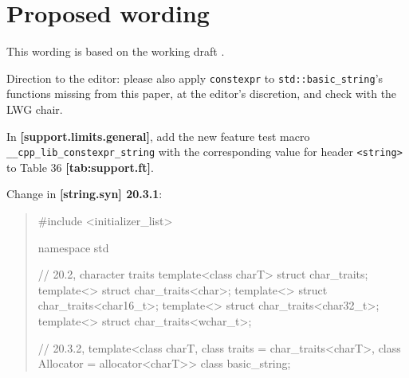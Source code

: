 \documentclass{wg21}
\newcommand{\cc}[1]{\texttt{#1}}
\begin{document}
\section{Proposed wording}
This wording is based on the working draft \cite{N4727}.

Direction to the editor: please also apply \cc{constexpr} to \cc{std::basic_string}'s
functions missing from this paper, at the editor's discretion, and check with
the LWG chair.

In \textbf{[support.limits.general]}, add the new feature test macro
\cc{__cpp_lib_constexpr_string} with the corresponding value for header
\cc{<string>} to Table 36 \textbf{[tab:support.ft]}.

Change in \textbf{[string.syn] 20.3.1}:
\begin{quote}
\begin{codeblock}
#include <initializer_list>

namespace std {
  // 20.2, character traits
  template<class charT> struct char_traits;
  template<> struct char_traits<char>;
  template<> struct char_traits<char16_t>;
  template<> struct char_traits<char32_t>;
  template<> struct char_traits<wchar_t>;

  // 20.3.2, 
  template<class charT, class traits = char_traits<charT>, class Allocator = allocator<charT>>
    class basic_string;

}
\end{codeblock}
\end{quote}
\end{document}
